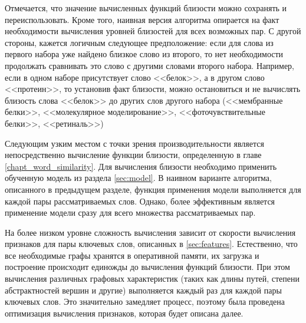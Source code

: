 Отмечается, что значение вычисленных функций близости можно сохранять и переиспользовать. Кроме того, наивная версия алгоритма опирается на факт необходимости вычисления уровней близостей для всех возможных пар. С другой стороны, кажется логичным следующее предположение: если для слова из первого набора уже найдено близкое слово из второго, то нет необходимости продолжать сравнивать это слово с другими словами второго набора. Например, если в одном наборе присутствует слово <<белок>>, а в другом слово <<протеин>>, то установив факт близости, можно остановиться и не вычислять близость слова <<белок>> до других слов другого набора (<<мембранные белки>>, <<молекулярное моделирование>>, <<фоточувствительные белки>>, <<ретиналь>>)

Следующим узким местом с точки зрения производительности является непосредственно вычисление функции близости, определенную в главе \ref{chapt_word_similarity}.  Для вычисления близости необходимо применить обученную модель из раздела \ref{sec:model}. В наивном варианте алгоритма, описанного в предыдущем разделе, функция применения модели выполняется для каждой пары рассматриваемых слов. Однако, более эффективным является применение модели сразу для всего множества рассматриваемых пар.

На более низком уровне сложность вычисления зависит от скорости вычисления признаков для пары ключевых слов, описанных в \ref{sec:features}. Естественно, что все необходимые графы хранятся в оперативной памяти, их загрузка и построение происходит единожды до вычисления функций близости. При этом вычисления различных графовых характеристик (таких как длины путей, степени абстрактностей вершин и другие) выполняется каждый раз для каждой пары ключевых слов. Это значительно замедляет процесс, поэтому была проведена оптимизация вычисления признаков, которая будет описана далее.


